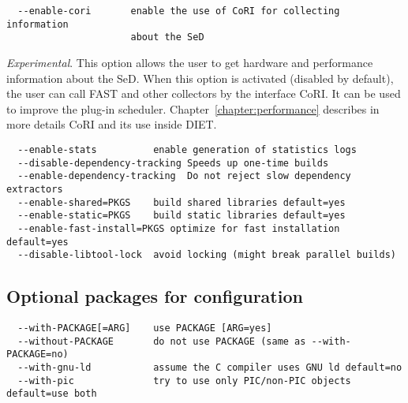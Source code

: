 {\footnotesize
\begin{verbatim}
  --enable-cori       enable the use of CoRI for collecting information 
                      about the SeD
\end{verbatim}
}
\noindent \textit{Experimental}.  This option allows the user to
get hardware and performance information about the SeD. When
this option is activated (disabled by default), the user can call FAST and other 
collectors by the interface CoRI. It can be used to improve the plug-in scheduler.
Chapter~\ref{chapter:performance} describes in more details CoRI and its use inside DIET.

{\footnotesize
\begin{verbatim}
  --enable-stats          enable generation of statistics logs
  --disable-dependency-tracking Speeds up one-time builds
  --enable-dependency-tracking  Do not reject slow dependency extractors
  --enable-shared=PKGS    build shared libraries default=yes
  --enable-static=PKGS    build static libraries default=yes
  --enable-fast-install=PKGS optimize for fast installation default=yes
  --disable-libtool-lock  avoid locking (might break parallel builds)
\end{verbatim}
}


\subsection{Optional packages for configuration}


{\footnotesize
\begin{verbatim}
  --with-PACKAGE[=ARG]    use PACKAGE [ARG=yes]
  --without-PACKAGE       do not use PACKAGE (same as --with-PACKAGE=no)
  --with-gnu-ld           assume the C compiler uses GNU ld default=no
  --with-pic              try to use only PIC/non-PIC objects default=use both
\end{verbatim}
}


